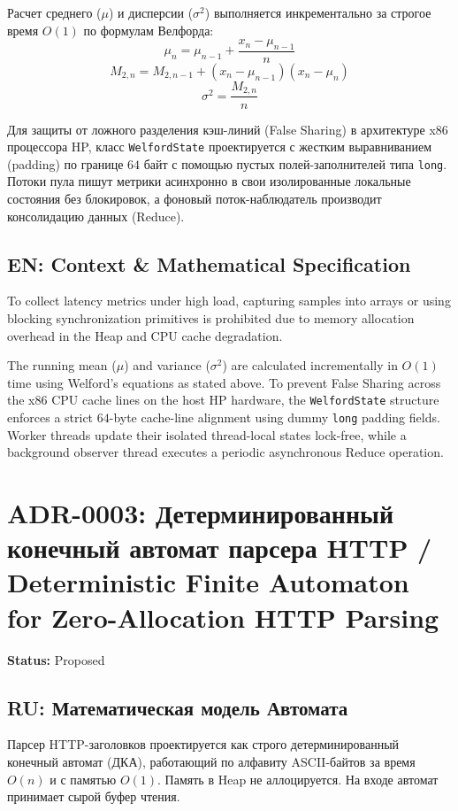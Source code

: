 \documentclass[12pt,a4paper]{article}
\begin{document}
Расчет среднего ($\mu$) и дисперсии ($\sigma^2$) выполняется инкрементально за строгое время $O(1)$ по формулам Велфорда:
$$\mu_n = \mu_{n-1} + \frac{x_n - \mu_{n-1}}{n}$$
$$M_{2,n} = M_{2,n-1} + (x_n - \mu_{n-1})(x_n - \mu_n)$$
$$\sigma^2 = \frac{M_{2,n}}{n}$$

Для защиты от ложного разделения кэш-линий (False Sharing) в архитектуре x86 процессора HP, класс \texttt{WelfordState} проектируется с жестким выравниванием (padding) по границе $64$ байт с помощью пустых полей-заполнителей типа \texttt{long}. Потоки пула пишут метрики асинхронно в свои изолированные локальные состояния без блокировок, а фоновый поток-наблюдатель производит консолидацию данных (Reduce).

\subsection*{EN: Context \& Mathematical Specification}
To collect latency metrics under high load, capturing samples into arrays or using blocking synchronization primitives is prohibited due to memory allocation overhead in the Heap and CPU cache degradation.

The running mean ($\mu$) and variance ($\sigma^2$) are calculated incrementally in $O(1)$ time using Welford's equations as stated above. To prevent False Sharing across the x86 CPU cache lines on the host HP hardware, the \texttt{WelfordState} structure enforces a strict $64$-byte cache-line alignment using dummy \texttt{long} padding fields. Worker threads update their isolated thread-local states lock-free, while a background observer thread executes a periodic asynchronous Reduce operation.


\section*{ADR-0003: Детерминированный конечный автомат парсера HTTP / Deterministic Finite Automaton for Zero-Allocation HTTP Parsing}
\textbf{Status:} Proposed \\

\subsection*{RU: Математическая модель Автомата}
Парсер HTTP-заголовков проектируется как строго детерминированный конечный автомат (ДКА), работающий по алфавиту ASCII-байтов за время $O(n)$ и с памятью $O(1)$. Память в Heap не аллоцируется. На входе автомат принимает сырой буфер чтения. 
\end{document}
